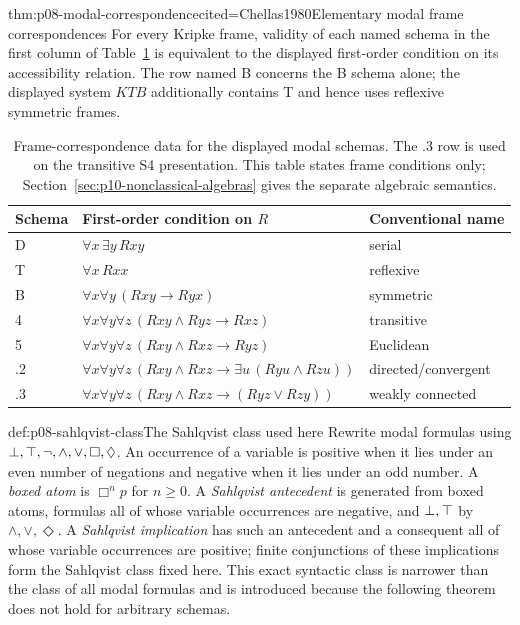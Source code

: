 \begin{hbtheorem}{thm:p08-modal-correspondence}{cited=Chellas1980}{Elementary modal frame correspondences}
For every Kripke frame, validity of each named schema in the first column of
Table~\ref{tab:p08-modal-correspondence} is equivalent to the displayed
first-order condition on its accessibility relation.  The row named B concerns
the B schema alone; the displayed system \(KTB\) additionally contains T and
hence uses reflexive symmetric frames.
\end{hbtheorem}

\begin{table}[!htbp]
\centering
\small
\begin{tabular}{@{}lll@{}}
\toprule
Schema & First-order condition on \(R\) & Conventional name \\
\midrule
D & \(\forall x\,\exists y\,Rxy\) & serial \\
T & \(\forall x\,Rxx\) & reflexive \\
B & \(\forall x\forall y\,(Rxy\to Ryx)\) & symmetric \\
4 & \(\forall x\forall y\forall z\,(Rxy\land Ryz\to Rxz)\) & transitive \\
5 & \(\forall x\forall y\forall z\,(Rxy\land Rxz\to Ryz)\) & Euclidean \\
.2 & \(\forall x\forall y\forall z\,
  (Rxy\land Rxz\to\exists u\,(Ryu\land Rzu))\) & directed/convergent \\
.3 & \(\forall x\forall y\forall z\,
  (Rxy\land Rxz\to(Ryz\lor Rzy))\) & weakly connected \\
\bottomrule
\end{tabular}
\caption{Frame-correspondence data for the displayed modal schemas.  The .3
row is used on the transitive S4 presentation.  This table states frame
conditions only; Section~\ref{sec:p10-nonclassical-algebras} gives the separate
algebraic semantics.}
\label{tab:p08-modal-correspondence}
\end{table}

\begin{hbdefinition}{def:p08-sahlqvist-class}{The Sahlqvist class used here}
Rewrite modal formulas using \(\bot,\top,\neg,\land,\lor,\Box,\Diamond\).
An occurrence of a variable is positive when it lies under an even number of
negations and negative when it lies under an odd number.  A \emph{boxed atom}
is \(\Box^n p\) for \(n\geq0\).  A \emph{Sahlqvist antecedent} is generated
from boxed atoms, formulas all of whose variable occurrences are negative,
and \(\bot,\top\) by \(\land,\lor,\Diamond\).  A \emph{Sahlqvist
implication} has such an antecedent and a consequent all of whose variable
occurrences are positive; finite conjunctions of these implications form the
Sahlqvist class fixed here.  This exact syntactic class is narrower than the
class of all modal formulas and is introduced because the following theorem
does not hold for arbitrary schemas.
\end{hbdefinition}

